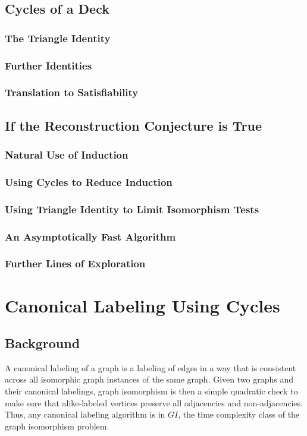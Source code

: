 \documentclass[11pt,a4paper]{report}
\begin{document}
\section{Cycles of a Deck}
\subsection{The Triangle Identity}
\subsection{Further Identities}
\subsection{Translation to Satisfiability}

\section{If the Reconstruction Conjecture is True}
\subsection{Natural Use of Induction}
\subsection{Using Cycles to Reduce Induction}
\subsection{Using Triangle Identity to Limit Isomorphism Tests}
\subsection{An Asymptotically Fast Algorithm}
\subsection{Further Lines of Exploration}



\chapter{Canonical Labeling Using Cycles}
\section{Background}
A canonical labeling of a graph is a labeling of edges in a way that is consistent across all isomorphic graph instances of the same graph.
Given two graphs and their canonical labelings, graph isomorphism is then a simple quadratic check to make sure that alike-labeled vertices preserve all adjacencies and non-adjacencies. 
Thus, any canonical labeling algorithm is in $GI$, the time complexity class of the graph isomorphism problem.
\end{document}
